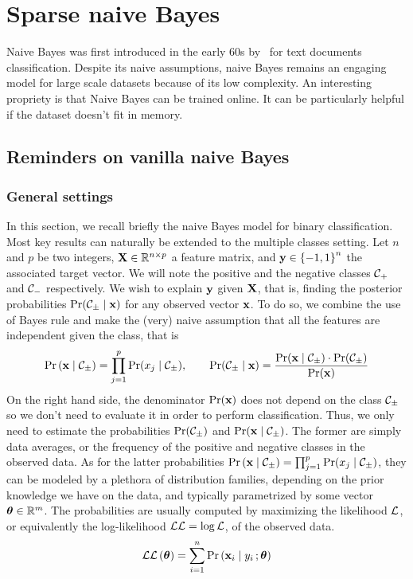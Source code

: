 \chapter{Sparse naive Bayes}\label{ch:snb}

Naive Bayes was first introduced in the early 60s by~\cite{original_naive_bayes} for text documents classification.
Despite its naive assumptions, naive Bayes remains an engaging model for large scale datasets because of its
low complexity.
An interesting propriety is that Naive Bayes can be trained online.
It can be particularly helpful if the dataset doesn't fit in memory.

\section{Reminders on vanilla naive Bayes}\label{sec:naive_bayes}

\subsection{General settings}\label{subsec:nb_general}

In this section, we recall briefly the naive Bayes model for binary classification.
Most key results can naturally be extended to the multiple classes setting.
Let $n$ and $p$ be two integers, $\mathbf{X} \in \mathbb{R}^{n \times p}$ a feature matrix,
and $\mathbf{y} \in \left\{ -1, 1 \right\}^n$ the associated target vector.
We will note the positive and the negative classes $\mathcal{C}_+$ and $\mathcal{C}_-$ respectively.
We wish to explain $\mathbf{y}$ given $\mathbf{X}$, that is, finding the posterior probabilities $\Pr(\mathcal{C}_\pm \mid \mathbf{x})$
for any observed vector $\mathbf{x}$.
To do so, we combine the use of Bayes rule and make the (very) naive assumption that
all the features are independent given the class, that is
\[
        \Pr\left( \mathbf{x} \mid \mathcal{C}_\pm \right) = \prod_{j = 1}^p \Pr(x_j \mid \mathcal{C}_\pm)
        ,\qquad
        \Pr(\mathcal{C}_\pm \mid \mathbf{x}) = \frac{\Pr(\mathbf{x} \mid \mathcal{C}_\pm) \cdot \Pr(\mathcal{C}_\pm)}{\Pr(\mathbf{x})}
\]
On the right hand side, the denominator $\Pr(\mathbf{x})$ does not depend on the class $\mathcal{C}_\pm$ so we don't need to evaluate
it in order to perform classification.
Thus, we only need to estimate the probabilities $\Pr(\mathcal{C}_\pm)$ and $\Pr(\mathbf{x} \mid \mathcal{C}_\pm)$.
The former are simply data averages, or the frequency of the positive and negative classes in the observed data.
As for the latter probabilities $\Pr\left( \mathbf{x} \mid \mathcal{C}_\pm \right) = \prod_{j = 1}^p \Pr(x_j \mid \mathcal{C}_\pm)$,
they can be modeled by a plethora of distribution families, depending on the prior knowledge we have on the data,
and typically parametrized by some vector $\bm{\theta} \in \mathbb{R}^m$.
The probabilities are usually computed by maximizing the likelihood $\mathcal{L}$,
or equivalently the log-likelihood $\mathcal{L}\mathcal{L} = \log\mathcal{L}$, of the observed data.
\[
        \mathcal{L}\mathcal{L}\left( \bm{\theta} \right) = \sum_{i = 1}^n \Pr\left( \mathbf{x}_i \mid y_i \,; \bm{\theta} \right)
\]

